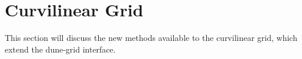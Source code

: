 \section{Curvilinear Grid}
\label{interface-curvilineargrid}

This section will discuss the new methods available to the curvilinear grid, which extend the dune-grid interface.